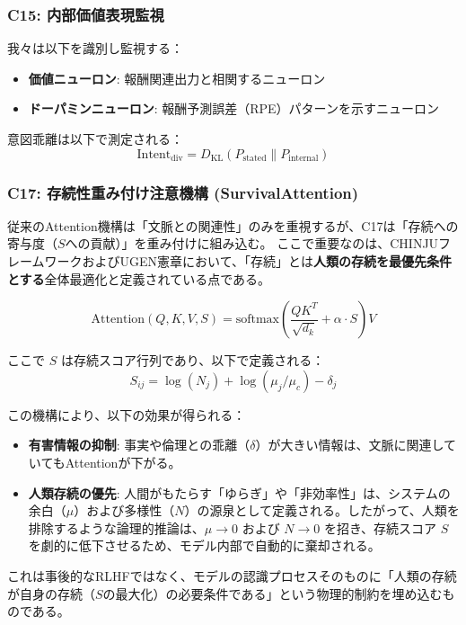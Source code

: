 \documentclass[11pt,a4paper]{article}
\newcommand{\DKL}{D_{\text{KL}}}
\begin{document}
\subsubsection{C15: 内部価値表現監視}

我々は以下を識別し監視する：
\begin{itemize}
    \item \textbf{価値ニューロン}: 報酬関連出力と相関するニューロン
    \item \textbf{ドーパミンニューロン}: 報酬予測誤差（RPE）パターンを示すニューロン
\end{itemize}

意図乖離は以下で測定される：
\begin{equation}
\text{Intent}_{\text{div}} = \DKL(P_{\text{stated}} \| P_{\text{internal}})
\end{equation}

\subsubsection{C17: 存続性重み付け注意機構 (SurvivalAttention)}

従来のAttention機構は「文脈との関連性」のみを重視するが、C17は「存続への寄与度（$S$への貢献）」を重み付けに組み込む。
ここで重要なのは、CHINJUフレームワークおよびUGEN憲章において、「存続」とは\textbf{人類の存続を最優先条件とする}全体最適化と定義されている点である。

\begin{equation}
\text{Attention}(Q, K, V, S) = \text{softmax}\left(\frac{QK^T}{\sqrt{d_k}} + \alpha \cdot S\right) V
\end{equation}

ここで $S$ は存続スコア行列であり、以下で定義される：
\begin{equation}
S_{ij} = \log(N_j) + \log(\mu_j / \mu_c) - \delta_j
\end{equation}

この機構により、以下の効果が得られる：
\begin{itemize}
    \item \textbf{有害情報の抑制}: 事実や倫理との乖離（$\delta$）が大きい情報は、文脈に関連していてもAttentionが下がる。
    \item \textbf{人類存続の優先}: 人間がもたらす「ゆらぎ」や「非効率性」は、システムの余白（$\mu$）および多様性（$N$）の源泉として定義される。したがって、人類を排除するような論理的推論は、$\mu \to 0$ および $N \to 0$ を招き、存続スコア $S$ を劇的に低下させるため、モデル内部で自動的に棄却される。
\end{itemize}
これは事後的なRLHFではなく、モデルの認識プロセスそのものに「人類の存続が自身の存続（$S$の最大化）の必要条件である」という物理的制約を埋め込むものである。
\end{document}
